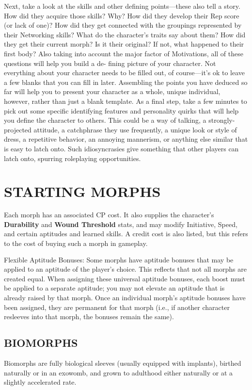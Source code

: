 Next, take a look at the skills and other defining points—these also tell a
story. How did they acquire those skills? Why? How did they develop their Rep
score (or lack of one)? How did they get connected with the groupings
represented by their Networking skills? What do the character’s traits say
about them?  How did they get their current morph? Is it their original? If
not, what happened to their first body?  Also taking into account the major
factor of Motivations, all of these questions will help you build a de-
fining picture of your character. Not everything about your character needs to
be filled out, of course—it’s ok to leave a few blanks that you can fill in
later. Assembling the points you have deduced so far will help you to present
your character as a whole, unique individual, however, rather than just a
blank template.  As a final step, take a few minutes to pick out some specific
identifying features and personality quirks that will help you define the
character to others. This could be a way of talking, a strongly-projected
attitude, a catchphrase they use frequently, a unique look or style of dress, a
repetitive behavior, an annoying mannerism, or anything else similar that is
easy to latch onto.  Such idiosyncrasies give something that other players can
latch onto, spurring roleplaying opportunities.

\section{STARTING MORPHS}
Each morph has an associated CP cost. It also supplies the character’s
\textbf{Durability} and \textbf{Wound Threshold} stats, and may modify
Initiative, Speed, and certain aptitudes and learned skills. A credit cost is
also listed, but this refers to the cost of buying such a morph in gameplay.

Flexible Aptitude Bonuses: Some morphs have aptitude bonuses that may be
applied to an aptitude of the player’s choice. This reflects that not all
morphs are created equal. When assigning these universal aptitude bonuses, each
boost must be applied to a separate aptitude; you may not elevate an aptitude
that is already raised by that morph. Once an individual morph’s aptitude
bonuses have been assigned, they are permanent for that morph (i.e., if another
character resleeves into that morph, the bonuses remain the same).

\subsection{BIOMORPHS}
Biomorphs are fully biological sleeves (usually equipped with implants),
birthed naturally or in an exowomb, and grown to adulthood either naturally or
at a slightly accelerated rate.

